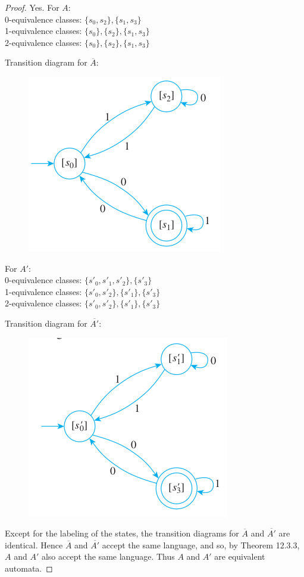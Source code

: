 \documentclass[14pt]{extarticle}
\begin{document}
\begin{proof}
    Yes. For \(A\): \\
    0-equivalence classes: \(\{s_0, s_2\}, \{s_1, s_3\}\) \\
    1-equivalence classes: \(\{s_0\}, \{s_2\}, \{s_1, s_3\}\) \\
    2-equivalence classes: \(\{s_0\}, \{s_2\}, \{s_1, s_3\}\)

    Transition diagram for \(\overline{A}\):

    \begin{figure}[ht!]
        \centering
        \includegraphics[scale=0.4]{../images/12.3.7.a.png}
    \end{figure}

    For \(A'\): \\
    0-equivalence classes: \(\{s'_0, s'_1, s'_2\}, \{s'_3\}\) \\
    1-equivalence classes: \(\{s'_0, s'_2\}, \{s'_1\}, \{s'_3\}\) \\
    2-equivalence classes: \(\{s'_0, s'_2\}, \{s'_1\}, \{s'_3\}\)

    Transition diagram for \(\overline{A'}\):

    \begin{figure}[ht!]
        \centering
        \includegraphics[scale=0.5]{../images/12.3.7.b.png}
    \end{figure}

    Except for the labeling of the states, the transition diagrams for \(\overline{A}\) and \(\overline{A'}\) are identical.
    Hence \(\overline{A}\) and \(\overline{A'}\) accept the same language, and so, by Theorem 12.3.3, \(A\) and \(A'\) also
    accept the same language. Thus \(A\) and \(A'\) are equivalent automata.
\end{proof}
\end{document}
